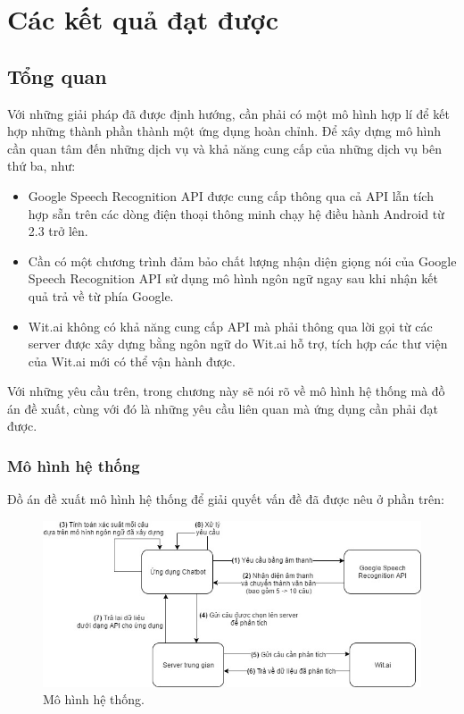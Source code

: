 \documentclass[12pt]{report}
\begin{document}
\stopcontents[parts]

\part{Các kết quả đạt được}
\startcontents[parts]

\chapter{Tổng quan}

Với những giải pháp đã được định hướng, cần phải có một mô hình hợp lí để kết hợp những thành phần thành một ứng dụng hoàn chỉnh. Để xây dựng mô hình cần quan tâm đến những dịch vụ và khả năng cung cấp của những dịch vụ bên thứ ba, như:

\begin{itemize}
	\item Google Speech Recognition API được cung cấp thông qua cả API lẫn tích hợp sẵn trên các dòng điện thoại thông minh chạy hệ điều hành Android từ 2.3 trở lên.
	\item Cần có một chương trình đảm bảo chất lượng nhận diện giọng nói của Google Speech Recognition API sử dụng mô hình ngôn ngữ ngay sau khi nhận kết quả trả về từ phía Google.
	\item Wit.ai không có khả năng cung cấp API mà phải thông qua lời gọi từ các server được xây dựng bằng ngôn ngữ do Wit.ai hỗ trợ, tích hợp các thư viện của Wit.ai mới có thể vận hành được.
\end{itemize}

Với những yêu cầu trên, trong chương này sẽ nói rõ về mô hình hệ thống mà đồ án đề xuất, cùng với đó là những yêu cầu liên quan mà ứng dụng cần phải đạt được.

\section{Mô hình hệ thống}
Đồ án đề xuất mô hình hệ thống để giải quyết vấn đề đã được nêu ở phần trên:

\begin{figure}[H] \label{fig:VVC}
	\centering
		\includegraphics[width=12cm]{Pics/Chap2/VVC.jpg}
	\caption{Mô hình hệ thống.}
\end{figure}
\end{document}
